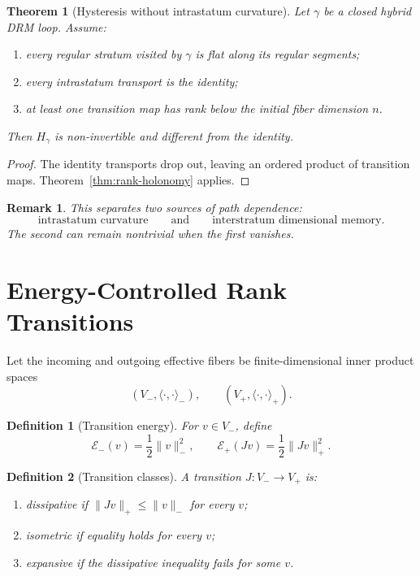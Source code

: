 \documentclass[11pt]{article}
\newtheorem{definition}{Definition}[section]
\newtheorem{theorem}{Theorem}[section]
\newtheorem{remark}{Remark}[section]
\begin{document}
\begin{theorem}[Hysteresis without intrastatum curvature]
\label{thm:flat-hysteresis}
Let $\gamma$ be a closed hybrid DRM loop. Assume:
\begin{enumerate}[label=(\roman*)]
\item every regular stratum visited by $\gamma$ is flat along its regular segments;
\item every intrastatum transport is the identity;
\item at least one transition map has rank below the initial fiber dimension
$n$.
\end{enumerate}
Then $H_\gamma$ is non-invertible and different from the identity.
\end{theorem}

\begin{proof}
The identity transports drop out, leaving an ordered product of transition
maps. Theorem~\ref{thm:rank-holonomy} applies.
\end{proof}

\begin{remark}
This separates two sources of path dependence:
\[
\text{intrastatum curvature}
\qquad\text{and}\qquad
\text{interstratum dimensional memory}.
\]
The second can remain nontrivial when the first vanishes.
\end{remark}

\section{Energy-Controlled Rank Transitions}
\label{sec:energy}

Let the incoming and outgoing effective fibers be finite-dimensional inner
product spaces
\[
(V_-,\langle\cdot,\cdot\rangle_-),
\qquad
(V_+,\langle\cdot,\cdot\rangle_+).
\]

\begin{definition}[Transition energy]
For $v\in V_-$, define
\[
\mathcal E_-(v)=\frac12\|v\|_-^2,
\qquad
\mathcal E_+(Jv)=\frac12\|Jv\|_+^2.
\]
\end{definition}

\begin{definition}[Transition classes]
A transition $J:V_-\to V_+$ is:
\begin{enumerate}[label=(\roman*)]
\item \emph{dissipative} if $\|Jv\|_+\le\|v\|_-$ for every $v$;
\item \emph{isometric} if equality holds for every $v$;
\item \emph{expansive} if the dissipative inequality fails for some $v$.
\end{enumerate}
\end{definition}
\end{document}
